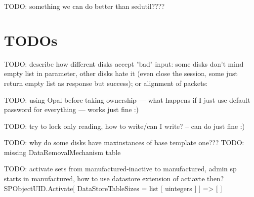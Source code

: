 TODO: something we can do better than sedutil????

\section{TODOs}


TODO: describe how different disks accept "bad" input: some disks don't mind empty list in parameter, other disks hate it (even close the session, some just return empty list  as response but success); or alignment of packets: 

TODO:  using Opal before taking ownership --- what happens if I just use default password for everything --- works just fine :)

TODO: try to lock only reading, how to write/can I write? -- can do just fine :)

TODO: why do some disks have maxinstances of base template one???
TODO: missing DataRemovalMechanism table



TODO: activate sets from manufactured-inactive to manufactured, admin sp starts in manufactured, how to use datastore extension of actiavte then?
SPObjectUID.Activate[
DataStoreTableSizes = list [ uintegers ]
]
=>
[ ]
